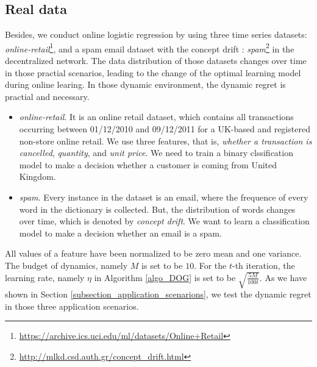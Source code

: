 \documentclass{article}
\begin{document}
\subsection{Real data}
Besides, we conduct online logistic regression by using three time series datasets:  \textit{online-retail}\footnote{\url{https://archive.ics.uci.edu/ml/datasets/Online+Retail}},  and a spam email dataset with the concept drift \citep{Katakis:2010:TR}: \textit{spam}\footnote{\url{http://mlkd.csd.auth.gr/concept_drift.html}} in the decentralized network. The data distribution of those datasets changes over time in those practial scenarios, leading to the change of the optimal learning model during online learing. In those dynamic environment, the dynamic regret is practial and necessary. 
\begin{itemize}
\item {\textit{online-retail}.} It is an online retail dataset, which contains all transactions occurring between 01/12/2010 and 09/12/2011 for a UK-based and registered non-store online retail. We use three features, that is, \textit{whether a transaction is cancelled}, \textit{quantity}, and \textit{unit price}. We need to train a binary clssification model to make a decision whether a customer is coming from United Kingdom. 
\item {\textit{spam}.} Every instance in the dataset is an email, where the frequence of every word in the dictionary is collected. But, the distribution of words changes over time, which is denoted by \textit{concept drift}\citep{Katakis:2010:TR}. We want to learn a classification model to make a decision whether an email is a spam. 
\end{itemize}
All values of a feature have been normalized to be zero mean and one variance. The budget of dynamics, namely $M$ is set to be $10$. For the $t$-th iteration, the learning rate, namely $\eta$ in Algorithm \ref{algo_DOG} is set to be $\sqrt{\frac{5M}{100t}}$.  As we have shown in Section \ref{subsection_application_scenarions}, we test the dynamic regret in those three application scenarios.  
\end{document}
